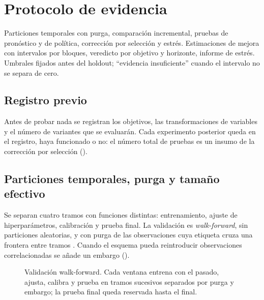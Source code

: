 \clearpage
\section{Protocolo de evidencia}\label{sec:evidencia}

{Particiones temporales con purga, comparación incremental, pruebas de pronóstico y de política,
corrección por selección y estrés.}
{Estimaciones de mejora con intervalos por bloques, veredicto por objetivo y horizonte, informe de
estrés.}
{Umbrales fijados antes del holdout; ``evidencia insuficiente'' cuando el intervalo no se separa de cero.}

\subsection{Registro previo}\label{sec:preregistro}

Antes de probar nada se registran los objetivos, las transformaciones de variables y el número de variantes
que se evaluarán. Cada experimento posterior queda en el registro, haya funcionado o no: el número total
de pruebas es un insumo de la corrección por selección ().

\subsection{Particiones temporales, purga y tamaño efectivo}\label{sec:particiones}

Se separan cuatro tramos con funciones distintas: entrenamiento, ajuste de hiperparámetros, calibración y
prueba final. La validación es \emph{walk-forward}, sin particiones aleatorias, y con purga de las
observaciones cuya etiqueta cruza una frontera entre tramos \citep{lopezdeprado2018}. Cuando el esquema
pueda reintroducir observaciones correlacionadas se añade un embargo ().

\begin{figure}[H]
\centering
\resizebox{\linewidth}{!}{}
\caption{Validación walk-forward. Cada ventana entrena con el pasado, ajusta, calibra y prueba en tramos
sucesivos separados por purga y embargo; la prueba final queda reservada hasta el final.}
\label{fig:walkforward}
\end{figure}

